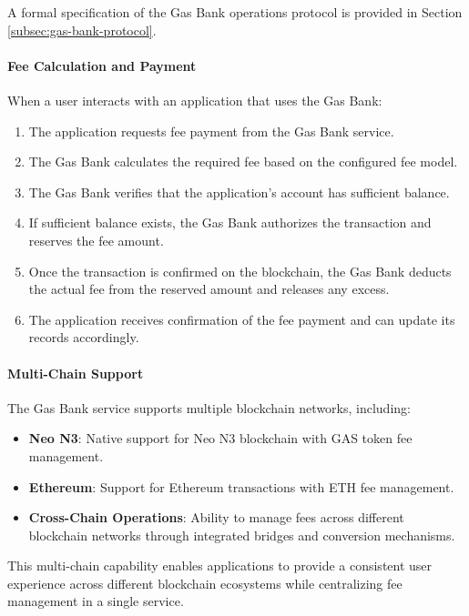 A formal specification of the Gas Bank operations protocol is provided in Section \ref{subsec:gas-bank-protocol}.



\paragraph{Fee Calculation and Payment}
When a user interacts with an application that uses the Gas Bank:

\begin{enumerate}
    \item The application requests fee payment from the Gas Bank service.
    \item The Gas Bank calculates the required fee based on the configured fee model.
    \item The Gas Bank verifies that the application's account has sufficient balance.
    \item If sufficient balance exists, the Gas Bank authorizes the transaction and reserves the fee amount.
    \item Once the transaction is confirmed on the blockchain, the Gas Bank deducts the actual fee from the reserved amount and releases any excess.
    \item The application receives confirmation of the fee payment and can update its records accordingly.
\end{enumerate}

\paragraph{Multi-Chain Support}
The Gas Bank service supports multiple blockchain networks, including:

\begin{itemize}
    \item \textbf{Neo N3}: Native support for Neo N3 blockchain with GAS token fee management.
    \item \textbf{Ethereum}: Support for Ethereum transactions with ETH fee management.
    \item \textbf{Cross-Chain Operations}: Ability to manage fees across different blockchain networks through integrated bridges and conversion mechanisms.
\end{itemize}

This multi-chain capability enables applications to provide a consistent user experience across different blockchain ecosystems while centralizing fee management in a single service.

